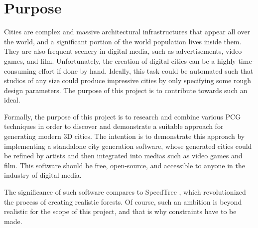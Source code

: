 \section{Purpose}


Cities are complex and massive architectural infrastructures that appear all over the world, and a significant portion of the world population lives inside them.
They are also frequent scenery in digital media, such as advertisements, video games, and film.
Unfortunately, the creation of digital cities can be a highly time-consuming effort if done by hand.
Ideally, this task could be automated such that studios of any size could produce impressive cities by only specifying some rough design parameters.
The purpose of this project is to contribute towards such an ideal.

Formally, the purpose of this project is to research and combine various PCG techniques in order to discover and demonstrate a suitable approach for generating modern 3D cities. 
The intention is to demonstrate this approach by implementing a standalone city generation software, whose generated cities could be refined by artists and then integrated into medias such as video games and film.
This software should be free, open-source, and accessible to anyone in the industry of digital media.

The significance of such software compares to SpeedTree \cite{speedtree}, which revolutionized the process of creating realistic forests.
Of course, such an ambition is beyond realistic for the scope of this project, and that is why constraints have to be made.
